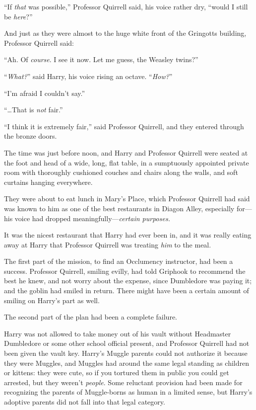 “If \emph{that} was possible,” Professor Quirrell said, his voice rather dry, “would I still be \emph{here}?”

And just as they were almost to the huge white front of the Gringotts building, Professor Quirrell said:

“Ah. Of \emph{course}. I see it now. Let me guess, the Weasley twins?”

“\emph{What?}” said Harry, his voice rising an octave.
“\emph{How?}”

“I’m afraid I couldn’t say.”

“…That is \emph{not} fair.”

“I think it is extremely fair,” said Professor Quirrell, and they entered through the bronze doors.

\later

The time was just before noon, and Harry and Professor Quirrell were seated at the foot and head of a wide, long, flat table, in a sumptuously appointed private room with thoroughly cushioned couches and chairs along the walls, and soft curtains hanging everywhere.

They were about to eat lunch in Mary’s Place, which Professor Quirrell had said was known to him as one of the best restaurants in Diagon Alley, especially for—his voice had dropped meaningfully—\emph{certain purposes.}

It was the nicest restaurant that Harry had ever been in, and it was really eating away at Harry that Professor Quirrell was treating \emph{him} to the meal.

The first part of the mission, to find an Occlumency instructor, had been a success. Professor Quirrell, smiling evilly, had told Griphook to recommend the best he knew, and not worry about the expense, since Dumbledore was paying it; and the goblin had smiled in return. There might have been a certain amount of smiling on Harry’s part as well.

The second part of the plan had been a complete failure.

Harry was not allowed to take money out of his vault without Headmaster Dumbledore or some other school official present, and Professor Quirrell had not been given the vault key. Harry’s Muggle parents could not authorize it because they were Muggles, and Muggles had around the same legal standing as children or kittens: they were cute, so if you tortured them in public you could get arrested, but they weren’t \emph{people}. Some reluctant provision had been made for recognizing the parents of Muggle-borns as human in a limited sense, but Harry’s adoptive parents did not fall into that legal category.

